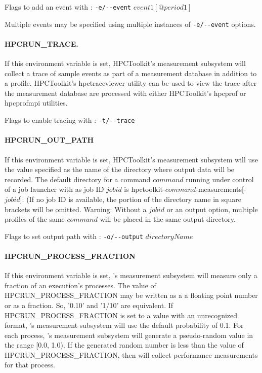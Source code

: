 \parg
Flags to add an event with \hpcrun: \verb|-e/--event| $event1[@period1]$ 

\parg
Multiple events may be specified using multiple instances of \verb|-e/--event| options.

\paragraph{HPCRUN\_TRACE.}

If this environment variable is set, HPCToolkit's measurement
subsystem will collect a trace of sample events as part of a measurement
database in addition to a profile. HPCToolkit's hpctraceviewer
utility can be used to view the trace after the measurement database
are processed with either HPCToolkit's hpcprof or hpcprofmpi
utilities.

\parg
Flags to enable tracing with \hpcrun: \verb|-t/--trace|

\paragraph{HPCRUN\_OUT\_PATH}

If this environment variable is set, HPCToolkit's measurement subsystem
will use the value specified as the name of the directory where
output data will be recorded. The default directory for a command
$command$ running under control of a job launcher with as job ID
$jobid$ is hpctoolkit-$command$-measurements[-$jobid$]. (If no
job ID is available, the portion of the directory name in square
brackets will be omitted. Warning: Without a $jobid$ or an output
option, multiple profiles of the same $command$ will be placed
in the same output directory.

\parg
Flags to set output path with \hpcrun: \verb|-o/--output| $directoryName$

\paragraph{HPCRUN\_PROCESS\_FRACTION}
\sloppy
If this environment variable is set, \HPCToolkit's measurement
subsystem will measure only a fraction of an execution’s processes.
The value of HPCRUN\_PROCESS\_FRACTION may be written as a a floating
point number or as a fraction.  So, '0.10' and '1/10' are equivalent.
If HPCRUN\_PROCESS\_FRACTION is set to a value with an unrecognized
format, \HPCToolkit's measurement subsystem will use the default
probability of 0.1. For each process, \HPCToolkit's measurement
subsystem will generate a pseudo-random value in the range [0.0, 1.0).
If the generated random number is less than the value of
HPCRUN\_PROCESS\_FRACTION, then \HPCToolkit{} will collect performance
measurements for that process.

